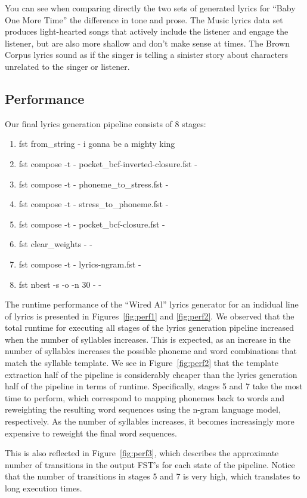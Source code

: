 \documentclass{vgtc}                          %
\begin{document}
You can see when comparing directly the two sets of generated
lyrics for ``Baby One More Time'' the difference in tone and prose. The Music
lyrics data set produces light-hearted songs that actively include the listener and engage the
listener, but are also more shallow and don't make sense at times.
The Brown Corpus lyrics sound as if the singer is telling a sinister story
about characters unrelated to the singer or listener.

\subsection{Performance}
Our final lyrics generation pipeline consists of 8 stages:
\begin{enumerate}
  \item fst from\_string - i gonna be a mighty king
  \item fst compose -t - pocket\_bcf-inverted-closure.fst -
  \item fst compose -t - phoneme\_to\_stress.fst -
  \item fst compose -t - stress\_to\_phoneme.fst -
  \item fst compose -t - pocket\_bcf-closure.fst -
  \item fst clear\_weights - -
  \item fst compose -t - lyrics-ngram.fst -
  \item fst nbest -s -o -n 30 - -
\end{enumerate}

The runtime performance of the ``Wired Al'' lyrics generator for an indidual
line of lyrics is presented
in Figures~\ref{fig:perf1} and \ref{fig:perf2}. We observed that the
total runtime for executing all stages of the lyrics generation
pipeline increased when the number of syllables increases. This is
expected, as an increase in the number of syllables increases
the possible phoneme and word combinations that match the
syllable template.
We see in Figure~\ref{fig:perf2} that
the template extraction half of the pipeline is considerably
cheaper than the lyrics generation half of the pipeline
in terms of runtime. Specifically, stages 5 and 7 take the most
time to perform, which correspond
to mapping phonemes back to words and reweighting the resulting
word sequences using the n-gram language model, respectively.
As the number of syllables increases, it becomes increasingly
more expensive to reweight the final word sequences.

This is also reflected in Figure~\ref{fig:perf3}, which
describes the approximate number of transitions in the
output FST's for each state of the pipeline.
Notice that the number of transitions in stages 5 and 7
is very high, which translates to long execution
times.
\end{document}
